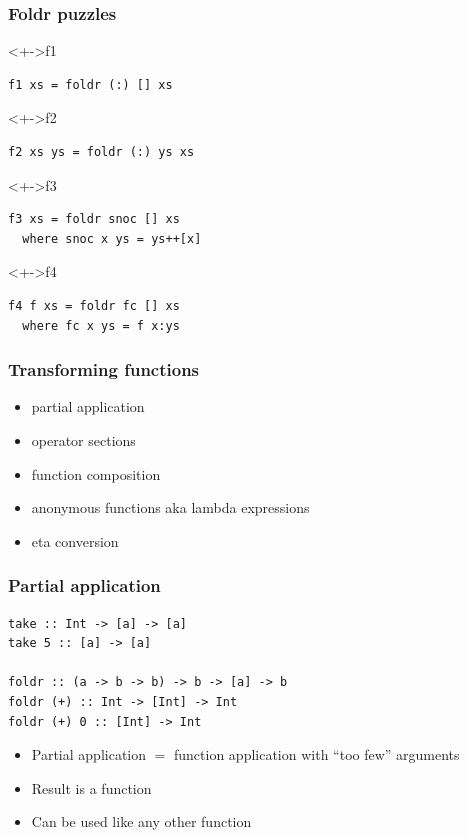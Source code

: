 \documentclass{beamer}
\begin{document}
\begin{frame}[fragile]
  \frametitle{Foldr puzzles}
  \begin{block}<+->{f1}
\begin{verbatim}
f1 xs = foldr (:) [] xs
\end{verbatim}
  \end{block}
  \begin{block}<+->{f2}
\begin{verbatim}
f2 xs ys = foldr (:) ys xs
\end{verbatim}
  \end{block}
  \begin{block}<+->{f3}
\begin{verbatim}
f3 xs = foldr snoc [] xs
  where snoc x ys = ys++[x]
\end{verbatim}
  \end{block}
  \begin{block}<+->{f4}
\begin{verbatim}
f4 f xs = foldr fc [] xs
  where fc x ys = f x:ys
\end{verbatim}
  \end{block}
\end{frame}
\begin{frame}
  \frametitle{Transforming functions}
  \begin{itemize}
  \item partial application
  \item operator sections
  \item function composition
  \item anonymous functions aka lambda expressions
  \item eta conversion
  \end{itemize}
\end{frame}
\begin{frame}[fragile]
  \frametitle{Partial application}
\begin{verbatim}
take :: Int -> [a] -> [a]
take 5 :: [a] -> [a]

foldr :: (a -> b -> b) -> b -> [a] -> b
foldr (+) :: Int -> [Int] -> Int
foldr (+) 0 :: [Int] -> Int
\end{verbatim}
  \begin{itemize}
  \item Partial application $=$ function application with ``too few'' arguments
  \item Result is a function
  \item Can be used like any other function
  \end{itemize}
\end{frame}
\end{document}
